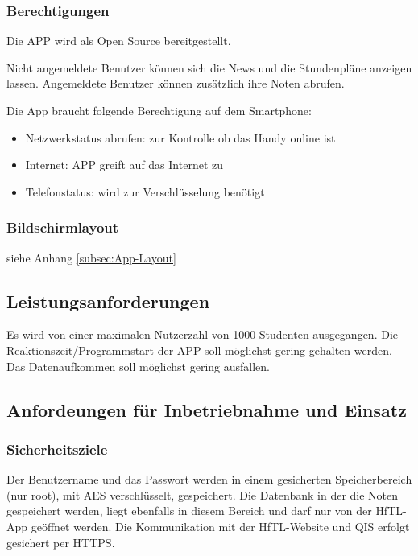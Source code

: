 \subsubsection{Berechtigungen}

Die APP wird als Open Source bereitgestellt.

Nicht angemeldete Benutzer können sich die News und die Stundenpläne anzeigen lassen. Angemeldete Benutzer können zusätzlich ihre Noten abrufen.

Die App braucht folgende Berechtigung auf dem Smartphone:
\begin{itemize}
	\item Netzwerkstatus abrufen: zur Kontrolle ob das Handy online ist
	\item Internet: APP greift auf das Internet zu
	\item Telefonstatus: wird zur Verschlüsselung benötigt
\end{itemize}




\subsubsection{Bildschirmlayout}
siehe Anhang \ref{subsec:App-Layout}










\subsection{\textbf{Leistungsanforderungen}}
Es wird von einer maximalen Nutzerzahl von 1000 Studenten ausgegangen.
Die Reaktionszeit/Programmstart der APP soll möglichst gering gehalten werden.
Das Datenaufkommen soll möglichst gering ausfallen.


\subsection{\textbf{Anfordeungen für Inbetriebnahme und Einsatz}}

\subsubsection{Sicherheitsziele}
Der Benutzername und das Passwort werden in einem gesicherten Speicherbereich (nur root), mit \acs{AES} verschlüsselt, gespeichert.
Die Datenbank in der die Noten gespeichert werden, liegt ebenfalls in diesem Bereich und darf nur von der \acs{HfTL}-App geöffnet werden.
Die Kommunikation mit der \acs{HfTL}-Website und \acs{QIS} erfolgt gesichert per \acs{HTTPS}.



